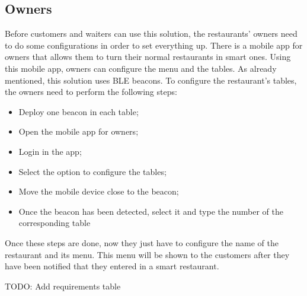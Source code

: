 \subsection{Owners}
\label{sub:owners}
Before customers and waiters can use this solution, the restaurants' owners
need to do some configurations in order to set everything up.
There is a mobile app for owners that allows them to turn their normal
restaurants in smart ones.
Using this mobile app, owners can configure the menu and the tables.
As already mentioned, this solution uses BLE beacons. To configure
the restaurant's tables, the owners need to perform the following steps:
\begin{itemize}
  \item Deploy one beacon in each table;
  \item Open the mobile app for owners;
  \item Login in the app;
  \item Select the option to configure the tables;
  \item Move the mobile device close to the beacon;
  \item Once the beacon has been detected, select it and type the number
  of the corresponding table
\end{itemize}
Once these steps are done, now they just have to configure the name of the
restaurant and its menu. This menu will be shown to the customers after they
have been notified that they entered in a smart restaurant.

TODO: Add requirements table
